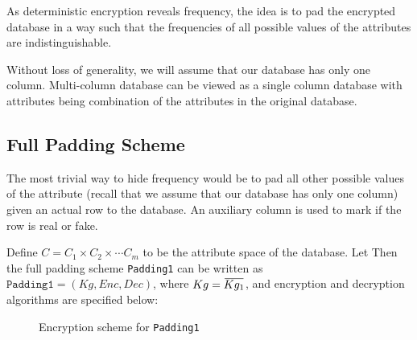 \documentclass[10pt]{book}
\newcommand{\overbar}[1]{\mkern 1.5mu\overline{\mkern-1.5mu#1\mkern-1.5mu}\mkern 1.5mu}
\begin{document}
As deterministic encryption reveals frequency, the idea is to pad the encrypted database in a way such that the frequencies of all possible values of the attributes are indistinguishable.

Without loss of generality, we will assume that our database has only one column. Multi-column database can be viewed as a single column database with attributes being combination of the attributes in the original database.


\subsection{Full Padding Scheme}
The most trivial way to hide frequency would be to pad all other possible values of the attribute (recall that we assume that our database has only one column) given an actual row to the database. An auxiliary column is used to mark if the row is real or fake.

Define $C = C_1 \times C_2 \times \cdots C_m$ to be the attribute space of the database. Let Then the full padding scheme \texttt{Padding1} can be written as $\texttt{{Padding1}} = (Kg, Enc, Dec)$, where $Kg = \overbar{Kg_1}$, and encryption and decryption algorithms are specified below:

\begin{figure}[H]
\begin{center}
\begin{pchstack}
	
	\pchspace
\end{pchstack}
\end{center}
\caption{Encryption scheme for \texttt{Padding1}}
\end{figure}
\end{document}
